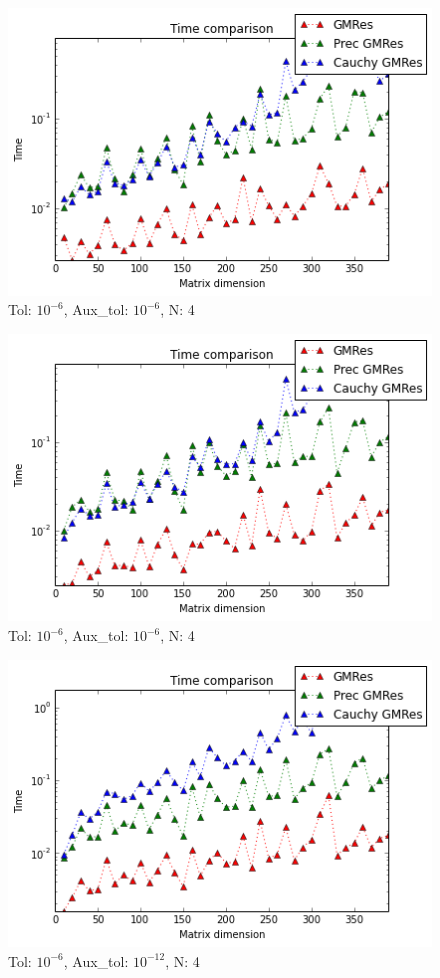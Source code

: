 \documentclass[fleqn]{article}
\begin{document}
\begin{figure}[ht]
    \centering
    \includegraphics[scale=0.4]{images/t2.png}
    \caption{Tol: $10^{-6}$, Aux\_tol: $10^{-6}$, N: 4}
    \label{fig:20}
\end{figure}
\newpage
\begin{figure}[ht]
    \centering
    \includegraphics[scale=0.4]{images/t3.png}
    \caption{Tol: $10^{-6}$, Aux\_tol: $10^{-6}$, N: 4}
    \label{fig:21}
\end{figure}
\begin{figure}[ht]
    \centering
    \includegraphics[scale=0.4]{images/t4.png}
    \caption{Tol: $10^{-6}$, Aux\_tol: $10^{-12}$, N: 4}
    \label{fig:22}
\end{figure}
\end{document}
